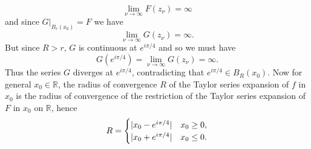 \begin{enumerate}[label = \textbf{Exercise \arabic*.},wide = 0pt, itemsep=1.5ex]
		\begin{equation}
			\lim_{\nu \to \infty}F(z_\nu) = \infty
		\end{equation}
		\noindent and since $G\vert_{B_r(x_0)} = F$ we have
		\begin{equation}
			\lim_{\nu \to \infty} G(z_\nu) = \infty.	
		\end{equation}
		\noindent But since $R > r$, $G$ is continuous at $e^{i\pi/4}$ and so we must have
		\begin{equation}
			G(e^{i\pi/4}) = \lim_{\nu \to \infty}G(z_\nu) = \infty.
		\end{equation}
		Thus the series $G$ diverges at $e^{i\pi/4}$, contradicting that $e^{i\pi/4} \in B_R(x_0)$. Now for general $x_0 \in \mathbb{R}$, the radius of convergence $R$ of the Taylor series expansion of $f$ in $x_0$ is the radius of convergence of the restriction of the Taylor series expansion of $F$ in $x_0$ on $\mathbb{R}$, hence
		\begin{align*}
			R = \begin{cases}
				\abs[0]{x_0 - e^{i\pi/4}} & x_0 \geq 0,\\
				\abs[0]{x_0 + e^{i\pi/4}} & x_0 \leq 0.
			\end{cases}
		\end{align*}


\end{enumerate}
